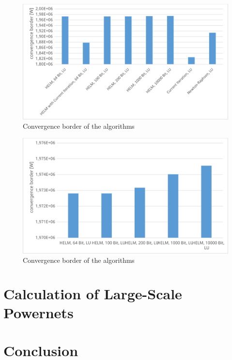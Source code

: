 \begin{figure}
	\centering
	\includegraphics[scale=0.7]{figures/convergence_border_vorstadtnetz_2}
	\caption[Comparison, convergence]{Convergence border of the algorithms}
	\label{fig:comparison_convergence_border_2}
\end{figure}

\begin{figure}
	\centering
	\includegraphics[scale=0.7]{figures/convergence_border_vorstadtnetz_3}
	\caption[Comparison, convergence]{Convergence border of the algorithms}
	\label{fig:comparison_convergence_border_3}
\end{figure}

\section{Calculation of Large-Scale Powernets}
\label{sec:large_scale_powernets}

\section{Conclusion}